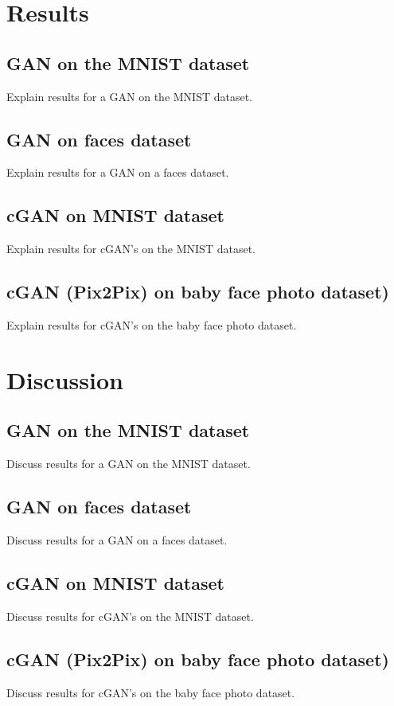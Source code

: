 \documentclass[a4paper,10pt, twocolumn]{article}
\begin{document}
\section{Results}
\subsection{GAN on the MNIST dataset}
Explain results for a GAN on the MNIST dataset.

\subsection{GAN on faces dataset}
Explain results for a GAN on a faces dataset.

\subsection{cGAN on MNIST dataset}
Explain results for cGAN's on the MNIST dataset.

\subsection{cGAN (Pix2Pix) on baby face photo dataset)}
Explain results for cGAN's on the baby face photo dataset.

\section{Discussion}
\subsection{GAN on the MNIST dataset}
Discuss results for a GAN on the MNIST dataset.

\subsection{GAN on faces dataset}
Discuss results for a GAN on a faces dataset.

\subsection{cGAN on MNIST dataset}
Discuss results for cGAN's on the MNIST dataset.

\subsection{cGAN (Pix2Pix) on baby face photo dataset)}
Discuss results for cGAN's on the baby face photo dataset.
\end{document}
